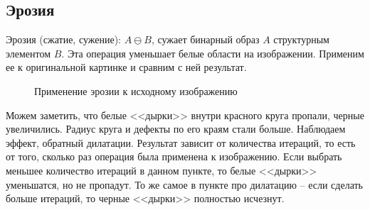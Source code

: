 \documentclass[a4paper, 12pt]{article}
\begin{document}
    \subsection{Эрозия}
    Эрозия (сжатие, сужение): $A\ominus B$, сужает бинарный образ $A$ структурным элементом $B$. Эта операция уменьшает
    белые области на изображении. Применим ее к оригинальной картинке и сравним с ней результат.
    \begin{figure}[H]
        \centering
        \captionsetup{skip=0pt}
        \caption{Применение эрозии к исходному изображению}
        \label{fig:er1}
    \end{figure}
    Можем заметить, что белые <<дырки>> внутри красного круга пропали, черные увеличились. Радиус круга и дефекты по его краям
    стали больше. Наблюдаем эффект, обратный дилатации. Результат зависит от количества итераций, то есть от того, сколько раз
    операция была применена к изображению. Если выбрать меньшее количество итераций в данном пункте, то белые <<дырки>> уменьшатся,
    но не пропадут. То же самое в пункте про дилатацию -- если сделать больше итераций, то черные <<дырки>> полностью исчезнут.
\end{document}
